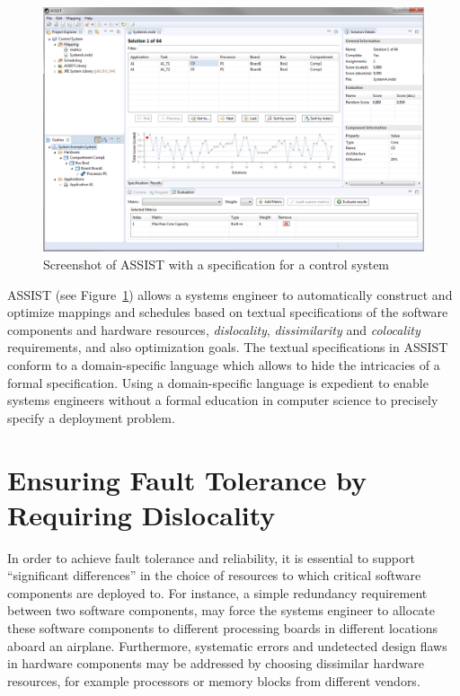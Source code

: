 \documentclass[english,biblatex]{lni}
\begin{document}
\begin{figure}[htbp]
\centering
\includegraphics[width=\textwidth]{assist-screenshot}
\caption{Screenshot of ASSIST with a specification for a control system}
\label{tool}
\end{figure}

ASSIST (see Figure~\ref{tool}) allows a systems engineer to automatically construct and optimize mappings and schedules based on textual specifications of the software components and hardware resources, \textit{dislocality}, \textit{dissimilarity} and \textit{colocality} requirements, and also optimization goals.
The textual specifications in ASSIST conform to a domain-specific language which allows to hide the intricacies of a formal specification.
Using a domain-specific language is expedient to enable systems engineers without a formal education in computer science to precisely specify a deployment problem.

\section{Ensuring Fault Tolerance by Requiring Dislocality}

In order to achieve fault tolerance and reliability, it is essential to support ``significant differences'' in the choice of resources to which critical software components are deployed to.
For instance, a simple redundancy requirement between two software components, may force the systems engineer to allocate these software components to different processing boards in different locations aboard an airplane.
Furthermore, systematic errors and undetected design flaws in hardware components may be addressed by choosing dissimilar hardware resources, for example processors or memory blocks from different vendors.
\end{document}

